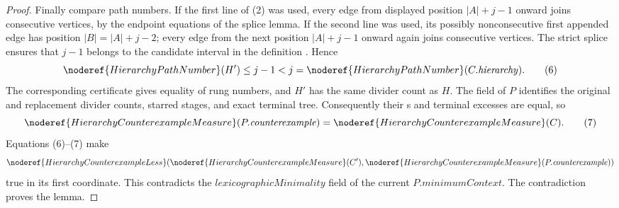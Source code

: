 \begin{proof}
Finally compare path numbers.  If the first line of (2) was used, every
edge from displayed position \(|A|+j-1\) onward joins consecutive
vertices, by the endpoint equations of the splice lemma.  If the second
line was used, its possibly nonconsecutive first appended edge has position
\(|B|=|A|+j-2\); every edge from the next position
\(|A|+j-1\) onward again joins consecutive vertices.  The strict splice
ensures that \(j-1\) belongs to the candidate interval in the definition
.  Hence
\[
 \noderef{HierarchyPathNumber}(H')\le j-1<j
       =\noderef{HierarchyPathNumber}(C.\mathit{hierarchy}). \tag{6}
\]
The corresponding certificate gives equality of rung numbers, and \(H'\)
has the same divider count as \(H\).  The
 field of \(P\) identifies the original and
replacement divider counts, starred stages, and exact terminal tree.
Consequently their s and terminal excesses
are equal, so
\[
 \noderef{HierarchyCounterexampleMeasure}(P.\mathit{counterexample})
   =\noderef{HierarchyCounterexampleMeasure}(C).              \tag{7}
\]
Equations (6)--(7) make
\[
 \noderef{HierarchyCounterexampleLess}
   (\noderef{HierarchyCounterexampleMeasure}(C'),
    \noderef{HierarchyCounterexampleMeasure}
       (P.\mathit{counterexample}))
\]
true in its first coordinate.  This contradicts the
\(\mathit{lexicographicMinimality}\) field of the current
\(P.\mathit{minimumContext}\).  The contradiction proves the lemma.
\end{proof}
